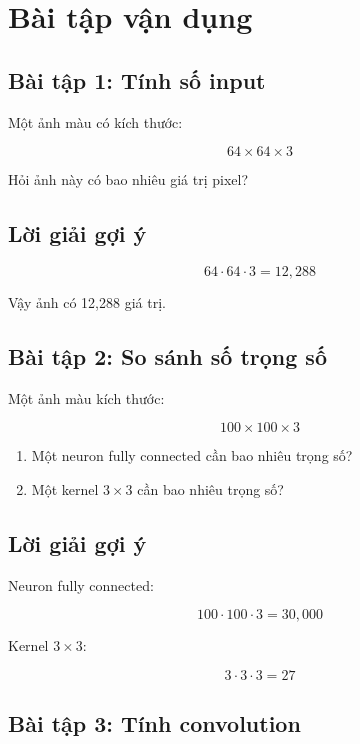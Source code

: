 \documentclass[12pt,a4paper]{report}
\begin{document}
\chapter{Bài tập vận dụng}

\section*{Bài tập 1: Tính số input}

Một ảnh màu có kích thước:

\[
    64\times64\times3
\]

Hỏi ảnh này có bao nhiêu giá trị pixel?

\section*{Lời giải gợi ý}

\[
    64\cdot64\cdot3=12,288
\]

Vậy ảnh có 12,288 giá trị.

\section*{Bài tập 2: So sánh số trọng số}

Một ảnh màu kích thước:

\[
    100\times100\times3
\]

\begin{enumerate}
    \item Một neuron fully connected cần bao nhiêu trọng số?
    \item Một kernel $3\times3$ cần bao nhiêu trọng số?
\end{enumerate}

\section*{Lời giải gợi ý}

Neuron fully connected:

\[
    100\cdot100\cdot3=30,000
\]

Kernel $3\times3$:

\[
    3\cdot3\cdot3=27
\]

\section*{Bài tập 3: Tính convolution}
\end{document}

